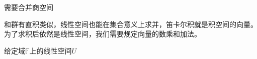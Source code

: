 

\begin{issues}
\issueDraft 
需要合并商空间
\end{issues}
和群有直积类似，线性空间也能在集合意义上求并，笛卡尔积就是积空间的向量。为了求积后依然是线性空间，我们需要规定向量的数乘和加法。

\begin{definition}{}
给定域$\mathbb F $上的线性空间$U$
\end{definition}